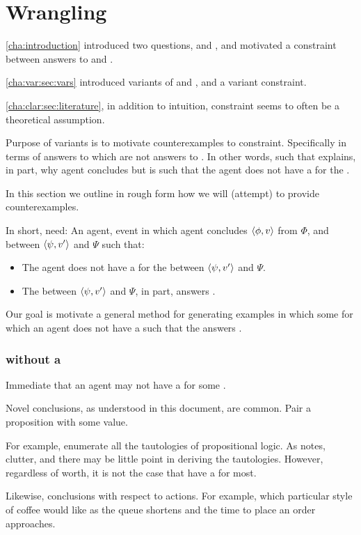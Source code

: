 \chapter{Wrangling}
\label{cha:var:wrang}

\begin{note}
  \autoref{cha:introduction} introduced two questions, \qWhy{} and \qHow{}, and motivated a constraint between answers to \qWhy{} and \qHow{}.

  \autoref{cha:var:sec:vars} introduced variants of \qWhy{} and \qHow{}, and a variant constraint.

  \autoref{cha:clar:sec:literature}, in addition to intuition, constraint seems to often be a theoretical assumption.

  Purpose of variants is to motivate counterexamples to constraint.
  Specifically in terms of answers to \qWhyVnP{} which are not answers to \qHowV{}.
  In other words, \ros{} such that \ros{} explains, in part, why agent concludes but is such that the agent does not have a \wit{} for the \ros{}.

  In this section we outline in rough form how we will (attempt) to provide counterexamples.

  In short, need:
  An agent, event in which agent concludes \(\langle \phi, v \rangle\) from \(\Phi\), and \ros{} between \(\langle \psi, v' \rangle\) and \(\Psi\) such that:

  \begin{itemize}
  \item
    The agent does not have a \wit{} for the \ros{} between \(\langle \psi, v' \rangle\) and \(\Psi\).
  \item
    The \ros{} between \(\langle \psi, v' \rangle\) and \(\Psi\), in part, answers \qWhyVnP{}.
  \end{itemize}

  Our goal is motivate a general method for generating examples in which some \ros{} for which an agent does not have a \wit{} such that the \ros{} answers \qWhyVnP{}.
\end{note}

\subsection{ without a \wit{}}

\begin{note}
  Immediate that an agent may not have a \wit{} for some \ros{}.

  Novel conclusions, as understood in this document, are common.
  Pair a proposition with some value.

  For example, enumerate all the tautologies of propositional logic.
  As \citeauthor{Harman:1973ww} notes, clutter, and there may be little point in deriving the tautologies.
  However, regardless of worth, it is not the case that have a \wit{} for most.

  Likewise, conclusions with respect to actions.
  For example, which particular style of coffee would like as the queue shortens and the time to place an order approaches.
\end{note}

